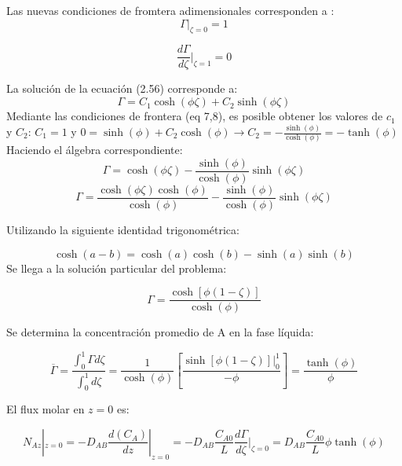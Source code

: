 Las nuevas condiciones de fromtera adimensionales corresponden a :
\begin{equation}
 \Gamma|_{\zeta=0}=1   
\end{equation}

\begin{equation}
 \frac{d\Gamma}{d\zeta}|_{\zeta=1}=0   
\end{equation}

La solución de la ecuación (2.56) corresponde a:
\begin{equation}
    \Gamma=C_1\cosh({\phi\zeta})+C_2\sinh({\phi\zeta})
\end{equation}
 Mediante las condiciones de frontera (eq {7,8}), es posible obtener los valores de $c_1$ y $C_2$:
 $C_1=1$ y $0=\sinh({\phi})+C_2\cosh(\phi)\longrightarrow C_2=-\frac{\sinh(\phi)}{\cosh({\phi})}=-\tanh({\phi})$
Haciendo el álgebra correspondiente:
\begin{equation*}
 \Gamma=\cosh({\phi\zeta})-\frac{\sinh(\phi)}{\cosh({\phi})}\sinh({\phi\zeta})   
\end{equation*}
\begin{equation*}
 \Gamma=\frac{\cosh({\phi\zeta})\cosh(\phi)}{\cosh(\phi)}-\frac{\sinh({\phi})}{\cosh(\phi)}\sinh({\phi\zeta})   
\end{equation*}

 Utilizando la siguiente identidad trigonométrica: 

 \begin{equation*}
   \cosh({a-b})=\cosh({a})\cosh(b)-\sinh(a) \sinh(b) 
 \end{equation*}
Se llega a la solución particular del problema:


 \begin{equation}
  \Gamma=\frac{\cosh[{\phi(1-\zeta)}]}{\cosh({\phi})}   
 \end{equation}

 Se determina la concentración promedio de A en la fase líquida:

 \begin{equation}
     \overline{\Gamma}=\frac{\int_0^1\Gamma d\zeta}{\int_0^1d\zeta}=\frac{1}{\cosh(\phi)}[\frac{\sinh[\phi(1-\zeta)]|_{0}^1}{-\phi}]=\frac{\tanh(\phi)}{\phi}
 \end{equation}
 
El flux molar en $z=0$ es:

\begin{equation}
    N_{Az}|_{z=0}=-D_{AB}\frac{d(C_A)}{dz}|_{z=0}=-D_{AB}\frac{C_{A0}}{L}\frac{d\Gamma}{d\zeta}|_{\zeta=0}=D_{AB}\frac{C_{A0}}{L}\phi\tanh(\phi)
\end{equation}



